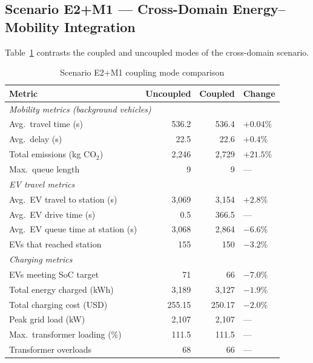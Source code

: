 \subsection{Scenario E2+M1 --- Cross-Domain Energy--Mobility Integration}

Table~\ref{tab:e2m1_results} contrasts the coupled and uncoupled modes of the cross-domain scenario.

\begin{table}[h]
    \centering
    \caption{Scenario E2+M1 coupling mode comparison}
    \label{tab:e2m1_results}
    \begin{tabular}{lrrl}
        \toprule
        \textbf{Metric} & \textbf{Uncoupled} & \textbf{Coupled} & \textbf{Change} \\
        \midrule
        \multicolumn{4}{l}{\textit{Mobility metrics (background vehicles)}} \\
        Avg.\ travel time (s)            & 536.2  & 536.4  & $+0.04\%$ \\
        Avg.\ delay (s)                  & 22.5   & 22.6   & $+0.4\%$  \\
        Total emissions (kg CO$_2$)      & 2{,}246 & 2{,}729 & $+21.5\%$ \\
        Max.\ queue length               & 9      & 9      & — \\
        \midrule
        \multicolumn{4}{l}{\textit{EV travel metrics}} \\
        Avg.\ EV travel to station (s)   & 3{,}069 & 3{,}154 & $+2.8\%$  \\
        Avg.\ EV drive time (s)          & 0.5    & 366.5  & — \\
        Avg.\ EV queue time at station (s)& 3{,}068 & 2{,}864 & $-6.6\%$  \\
        EVs that reached station         & 155    & 150    & $-3.2\%$  \\
        \midrule
        \multicolumn{4}{l}{\textit{Charging metrics}} \\
        EVs meeting SoC target           & 71     & 66     & $-7.0\%$  \\
        Total energy charged (kWh)       & 3{,}189 & 3{,}127 & $-1.9\%$  \\
        Total charging cost (USD)        & 255.15 & 250.17 & $-2.0\%$  \\
        Peak grid load (kW)              & 2{,}107 & 2{,}107 & — \\
        Max.\ transformer loading (\%)   & 111.5  & 111.5  & — \\
        Transformer overloads            & 68     & 66     & — \\
        \bottomrule
    \end{tabular}
\end{table}

